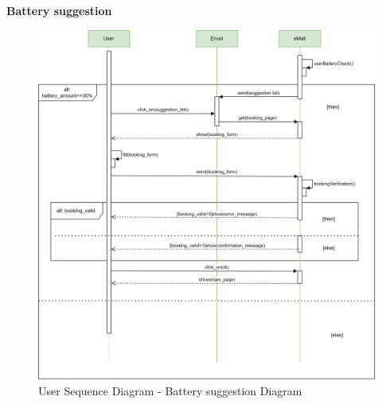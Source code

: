 \documentclass[table, 12pt]{article} %
\begin{document}
\begin{itemize}
            \newpage
            \textbf{Battery suggestion}
            \begin{center}
                \begin{figure}[H]
                    \includegraphics[scale=0.55, center]{assets/sequenceDiagrams/Battery Suggestion.png}
                    \caption{User Sequence Diagram - Battery suggestion Diagram}
                    \label{fig: Battery suggestion process}
                \end{figure}
            \end{center}


\end{itemize}
\end{document}
